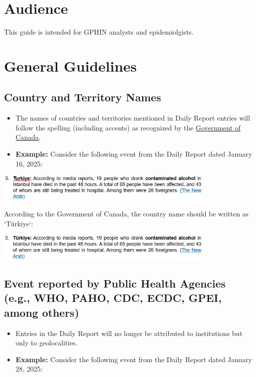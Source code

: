 \documentclass[a4paper,12pt]{article}
\begin{document}
\section{Audience}
This guide is intended for GPHIN analysts and epidemiolgists.

\section{General Guidelines}

\subsection{Country and Territory Names}
\begin{itemize}
    \item The names of countries and territories mentioned in Daily Report entries will follow the spelling (including accents) as recognized by the \href{https://www.canada.ca/en/government/system/digital-government/digital-government-innovations/enabling-interoperability/gc-enterprise-data-reference-standards/current-past-official-names-countries-territories-geographic-areas.html}{Government of Canada}.

    \item \textbf{Example:} Consider the following event from the Daily Report dated January 16, 2025:

\end{itemize}

\begin{center}
    \includegraphics[width=0.8\textwidth]{images/dr_entry_250116_3.png}
\end{center}


According to the Government of Canada, the country name should be written as `Türkiye`:

\begin{center}
    \includegraphics[width=0.8\textwidth]{images/dr_entry_250116_3_corrected.png}
\end{center}



\subsection{Event reported by Public Health Agencies (e.g., WHO, PAHO, CDC, ECDC, GPEI, among others)}
\begin{itemize}
    \item Entries in the Daily Report will no longer be attributed to institutions but only to geolocalities.

    \item \textbf{Example:} Consider the following event from the Daily Report dated January 28, 2025:
\end{itemize}
\end{document}
